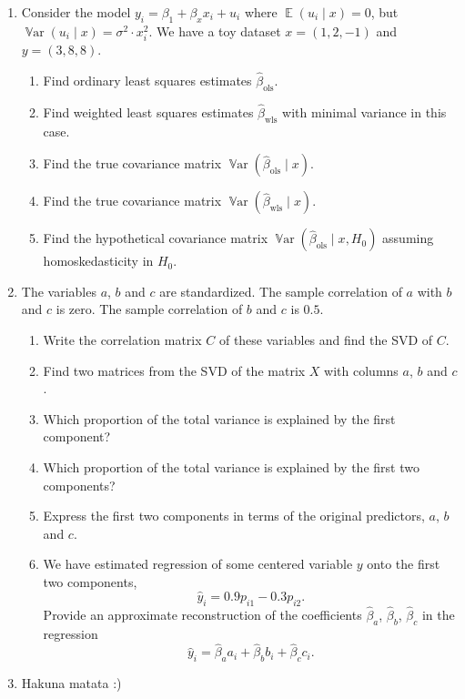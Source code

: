 \documentclass[12pt]{article}
\DeclareMathOperator{\Var}{\mathbb{V}ar}
\DeclareMathOperator{\E}{\mathbb{E}}
\newcommand{\hb}{\hat\beta}
\begin{document}
\begin{enumerate}
    \item Consider the model $y_i = \beta_1 + \beta_x x_i + u_i$ where $\E(u_i \mid x) = 0$, but $\Var(u_i \mid x) = \sigma^2 \cdot x^2_i$.
    We have a toy dataset $x = (1, 2, -1)$ and $y = (3, 8, 8)$.
    
    \begin{enumerate}
        \item Find ordinary least squares estimates $\hb_{\text{ols}}$.
        \item Find weighted least squares estimates $\hb_{\text{wls}}$ with minimal variance in this case. 
        \item Find the true covariance matrix $\Var(\hb_{\text{ols}} \mid x)$.
        \item Find the true covariance matrix $\Var(\hb_{\text{wls}} \mid x)$.
        \item Find the hypothetical covariance matrix $\Var(\hb_{\text{ols}} \mid x, H_0)$ assuming homoskedasticity in $H_0$.
        \end{enumerate}
        

    \item The variables $a$, $b$ and $c$ are standardized. 
    The sample correlation of $a$ with $b$ and $c$ is zero. 
    The sample correlation of $b$ and $c$ is $0.5$.

    \begin{enumerate}
        \item Write the correlation matrix $C$ of these variables and find the SVD of $C$. 
        \item Find two matrices from the SVD of the matrix $X$ with columns $a$, $b$ and $c$.
        \item Which proportion of the total variance is explained by the first component?
        \item Which proportion of the total variance is explained by the first two components?
        \item Express the first two components in terms of the original predictors, $a$, $b$ and $c$. 
        \item We have estimated regression of some centered variable $y$ onto the first two components,
        \[
        \hat y_i = 0.9 p_{i1} - 0.3 p_{i2}.
        \]
        Provide an approximate reconstruction of the coefficients $\hb_a$, $\hb_b$, $\hb_c$ 
        in the regression 
        \[
        \hat y_i = \hb_a a_i + \hb_b b_i + \hb_c c_i. 
        \]
    \end{enumerate}

    \item Hakuna matata :)

\end{enumerate}
\end{document}
